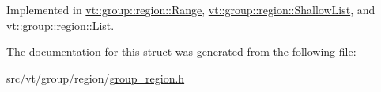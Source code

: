 Implemented in \hyperlink{structvt_1_1group_1_1region_1_1_range_a409f171c688707fa71e4aea1099ce691}{vt\+::group\+::region\+::\+Range}, \hyperlink{structvt_1_1group_1_1region_1_1_shallow_list_a358a60631cc0d1dd55d72af82e287014}{vt\+::group\+::region\+::\+Shallow\+List}, and \hyperlink{structvt_1_1group_1_1region_1_1_list_aaa38a1cc3062ed93fd6d6fbe2c65f1cf}{vt\+::group\+::region\+::\+List}.



The documentation for this struct was generated from the following file\+:\begin{DoxyCompactItemize}
\item 
src/vt/group/region/\hyperlink{group__region_8h}{group\+\_\+region.\+h}\end{DoxyCompactItemize}
